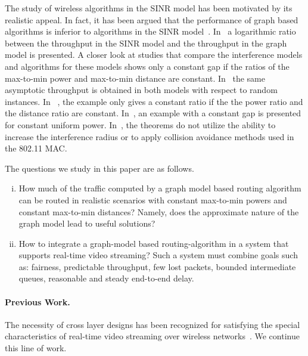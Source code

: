 \documentclass[12pt]{article}
\newenvironment{proof sketch}[1]{\noindent {\emph{Proof sketch of #1:}}}{\hfill \qed}
\newcommand{\SNR}{\text{\sc{snr}}}
\newcommand{\MCS}{\text{\sc{mcs}}}
\begin{document}
The study of wireless algorithms in the SINR model has been motivated
by its realistic appeal. In fact, it has been argued that the
performance of graph based algorithms is inferior to algorithms in the
SINR model~\cite{goussevskaia2007complexity}.
In~\cite{moscibroda2006protocol,moscibroda2006topology} a logarithmic
ratio between the throughput in the SINR model and the throughput in
the graph model is presented.  A closer look at studies that compare
the interference models and algorithms for these models shows only a
constant gap if the ratios of the max-to-min power and max-to-min
distance are constant.  In~\cite{gupta2000capacity} the same
asymptotic throughput is obtained in both models with respect to
random instances. In ~\cite{moscibroda2006protocol}, the example only
gives a constant ratio if the the power ratio and the distance ratio
are constant.  In~\cite{ChafekarCapacity}, an example with a constant
gap is presented for constant uniform power.
In~\cite{behzad2004performance}, the theorems do not utilize the
ability to increase the interference radius or to apply collision
avoidance methods used in the 802.11 MAC.

The questions we study in this paper are as follows.
\begin{enumerate}[(i)]
\item How much of the traffic computed by a graph model based routing
  algorithm can be routed in realistic scenarios with constant
  max-to-min powers and constant max-to-min distances? Namely, does
  the approximate nature of the graph model lead to useful solutions?
\item How to integrate a graph-model based routing-algorithm in a
  system that supports real-time video streaming? Such a system must
  combine goals such as: fairness, predictable throughput, few lost
  packets, bounded intermediate queues, reasonable and steady
  end-to-end delay.
\end{enumerate}

\paragraph{Previous Work.}  The necessity of cross layer designs has been
recognized for satisfying the special characteristics of real-time
video streaming over wireless
networks~\cite{shan2005cross,setton2005cross,khan2006application}.  We
continue this line of work.

\end{document}
